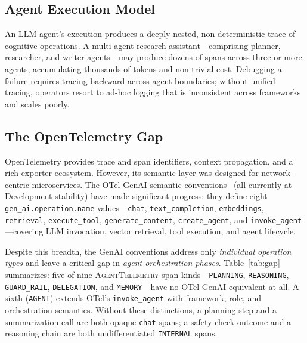 \documentclass[sigplan,10pt,screen]{acmart}
\begin{document}
\subsection{Agent Execution Model}

An LLM agent's execution produces a deeply nested, non-deterministic
trace of cognitive operations.  A multi-agent research
assistant---comprising planner, researcher, and writer agents---may
produce dozens of spans across three or more agents, accumulating
thousands of tokens and non-trivial cost.  Debugging a failure requires
tracing backward across agent boundaries; without unified tracing,
operators resort to ad-hoc logging that is inconsistent across
frameworks and scales poorly.

\subsection{The OpenTelemetry Gap}

OpenTelemetry provides trace and span identifiers, context propagation,
and a rich exporter ecosystem.  However, its semantic layer was designed
for network-centric microservices.  The OTel GenAI semantic
conventions~\cite{otel} (all currently at Development stability) have
made significant progress: they define eight \texttt{gen\_ai.operation.name}
values---\texttt{chat}, \texttt{text\_completion}, \texttt{embeddings},
\texttt{retrieval}, \texttt{execute\_tool}, \texttt{generate\_content},
\texttt{create\_agent}, and \texttt{invoke\_agent}---covering
LLM invocation, vector retrieval, tool execution, and agent lifecycle.

Despite this breadth, the GenAI conventions address only \emph{individual
operation types} and leave a critical gap in \emph{agent orchestration
phases}.  Table~\ref{tab:gap} summarizes: five of nine
\textsc{AgentTelemetry} span kinds---\texttt{PLANNING},
\texttt{REASONING}, \texttt{GUARD\_RAIL}, \texttt{DELEGATION}, and
\texttt{MEMORY}---have no OTel GenAI equivalent at all.  A sixth
(\texttt{AGENT}) extends OTel's \texttt{invoke\_agent} with framework,
role, and orchestration semantics.  Without these distinctions, a
planning step and a summarization call are both opaque \texttt{chat}
spans; a safety-check outcome and a reasoning chain are both undifferentiated
\texttt{INTERNAL} spans.
\end{document}
